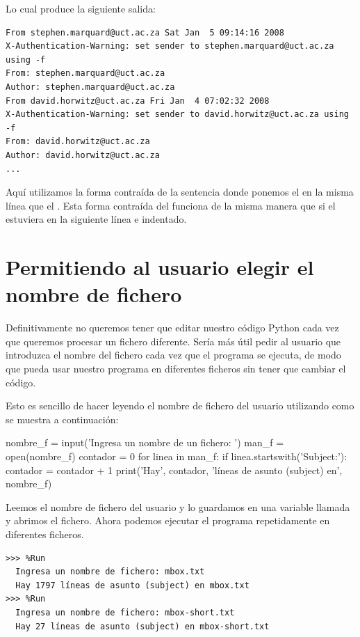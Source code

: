 Lo cual produce la siguiente salida:

\begin{Verbatim}[frame=single]
From stephen.marquard@uct.ac.za Sat Jan  5 09:14:16 2008
X-Authentication-Warning: set sender to stephen.marquard@uct.ac.za using -f
From: stephen.marquard@uct.ac.za
Author: stephen.marquard@uct.ac.za
From david.horwitz@uct.ac.za Fri Jan  4 07:02:32 2008
X-Authentication-Warning: set sender to david.horwitz@uct.ac.za using -f
From: david.horwitz@uct.ac.za
Author: david.horwitz@uct.ac.za
...
\end{Verbatim}

Aquí utilizamos la forma contraída de la sentencia  donde
ponemos el  en la misma línea que el . Esta
forma contraída del  funciona de la misma manera que si el
 estuviera en la siguiente línea e indentado.

\hypertarget{permitiendo-al-usuario-elegir-el-nombre-de-fichero}{%
\section{Permitiendo al usuario elegir el nombre de
fichero}\label{permitiendo-al-usuario-elegir-el-nombre-de-fichero}}

Definitivamente no queremos tener que editar nuestro código Python cada
vez que queremos procesar un fichero diferente. Sería más útil pedir al
usuario que introduzca el nombre del fichero cada vez que el programa se
ejecuta, de modo que pueda usar nuestro programa en diferentes ficheros
sin tener que cambiar el código.

Esto es sencillo de hacer leyendo el nombre de fichero del usuario
utilizando  como se muestra a continuación:

\begin{python}[frame=single]
nombre_f = input('Ingresa un nombre de un fichero: ')
man_f = open(nombre_f)
contador = 0
for linea in man_f:
    if linea.startswith('Subject:'):
        contador = contador + 1
print('Hay', contador, 'líneas de asunto (subject) en', nombre_f)
\end{python}

Leemos el nombre de fichero del usuario y lo guardamos en una variable
llamada  y abrimos el fichero. Ahora podemos ejecutar el programa repetidamente en diferentes ficheros.

\begin{Verbatim}[frame=single]
>>> %Run
  Ingresa un nombre de fichero: mbox.txt
  Hay 1797 líneas de asunto (subject) en mbox.txt
>>> %Run
  Ingresa un nombre de fichero: mbox-short.txt
  Hay 27 líneas de asunto (subject) en mbox-short.txt
\end{Verbatim}


